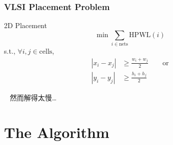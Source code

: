 \documentclass[UTF8,lualatex]{ctexbeamer}
\newcommand{\hpwl}{\text{HPWL}}
\newcommand{\nets}{\text{nets}}
\newcommand{\cells}{\text{cells}}
\begin{document}
\begin{frame}
    \frametitle{VLSI Placement Problem}
    \begin{block}{2D Placement}
        \[
            \min\sum_{i\in\nets} \hpwl(i)
        \]
        s.t., $\forall i,j\in\cells$,
        \begin{align*}
            \left|x_i - x_j\right| &\geqslant \frac{w_i + w_j}{2} \qquad\text{or}\\
            \left|y_i - y_j\right| &\geqslant \frac{h_i + h_j}{2}
        \end{align*}
    \end{block}
    \begin{alertblock}{~}
        然而解得太慢\dots
    \end{alertblock}
\end{frame}


\section{The Algorithm}
\end{document}
